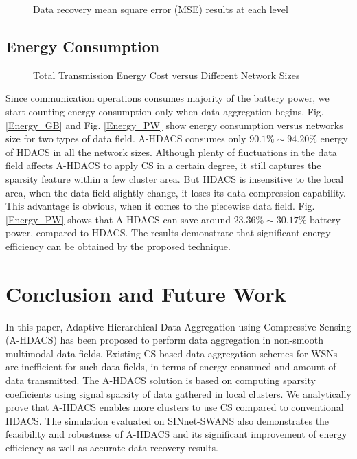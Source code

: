 \documentclass[conference]{IEEEtran}
\begin{document}
\begin{figure}
\centering
{}
\qquad
{}
\caption{Data recovery mean square error (MSE) results at each level }
\label{MSE}
\end{figure}


\subsection{Energy Consumption}

\begin{figure}[!t]
\centering
{}
\qquad
{}
\caption{Total Transmission Energy Cost versus Different Network Sizes}
\label{TotalCost}
\end{figure}

Since communication operations consumes majority of the battery power, we start counting energy consumption 
only when data aggregation begins. Fig. \ref{Energy_GB}  and Fig. \ref{Energy_PW} show energy consumption
versus networks size for two types of data field. A-HDACS consumes only $90.1\% \sim 94.20\% $ 
energy of HDACS in all the network sizes. Although plenty of 
fluctuations in the data field affects A-HDACS to apply CS in a certain degree, 
it still captures the sparsity feature within a few cluster area. But HDACS is 
insensitive to the local area, when the data field slightly change, it loses 
its data compression capability. This advantage is obvious, when it comes to 
the piecewise data field. Fig. \ref{Energy_PW} shows that A-HDACS can save around 
$23.36\% \sim 30.17\%$ battery power, compared to HDACS. The results demonstrate that significant 
energy efficiency can be obtained by the proposed technique.  

\section{Conclusion and Future Work}
In this paper, Adaptive Hierarchical Data Aggregation using Compressive Sensing (A-HDACS) has been 
proposed to perform data aggregation in non-smooth multimodal data fields. Existing CS based data aggregation schemes for WSNs are 
inefficient for such data fields, in terms of energy consumed and amount of data transmitted.
The A-HDACS solution is based on computing sparsity coefficients using 
signal sparsity of data gathered in local clusters.
We analytically prove that A-HDACS enables more clusters to use CS 
compared to conventional HDACS. The simulation evaluated on SINnet-SWANS also demonstrates
the feasibility and robustness of A-HDACS and its significant improvement of 
energy efficiency as well as accurate data recovery results.
\end{document}

